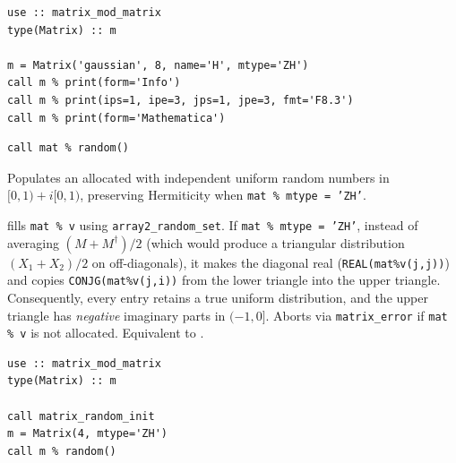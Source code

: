 \lstset{language=[95]Fortran}
\begin{lstlisting}
use :: matrix_mod_matrix
type(Matrix) :: m

m = Matrix('gaussian', 8, name='H', mtype='ZH')
call m % print(form='Info')
call m % print(ips=1, ipe=3, jps=1, jpe=3, fmt='F8.3')
call m % print(form='Mathematica')
\end{lstlisting}


\lstset{language=[95]Fortran}
\begin{lstlisting}
call mat % random()
\end{lstlisting}

Populates an allocated  with independent uniform random numbers in $[0,1) + i[0,1)$, preserving Hermiticity when \texttt{mat \% mtype = 'ZH'}.

 fills \texttt{mat \% v} using \texttt{array2\_random\_set}. If \texttt{mat \% mtype = 'ZH'}, instead of averaging $(M + M^\dagger)/2$ (which would produce a triangular distribution $(X_1+X_2)/2$ on off-diagonals), it makes the diagonal real (\texttt{REAL(mat\%v(j,j))}) and copies \texttt{CONJG(mat\%v(j,i))} from the lower triangle into the upper triangle. Consequently, every entry retains a true uniform distribution, and the upper triangle has \emph{negative} imaginary parts in $(-1,0]$. Aborts via \texttt{matrix\_error} if \texttt{mat \% v} is not allocated. Equivalent to .

\begin{description}[leftmargin=2.2cm, style=nextline]
\end{description}

\lstset{language=[95]Fortran}
\begin{lstlisting}
use :: matrix_mod_matrix
type(Matrix) :: m

call matrix_random_init
m = Matrix(4, mtype='ZH')
call m % random()
\end{lstlisting}

